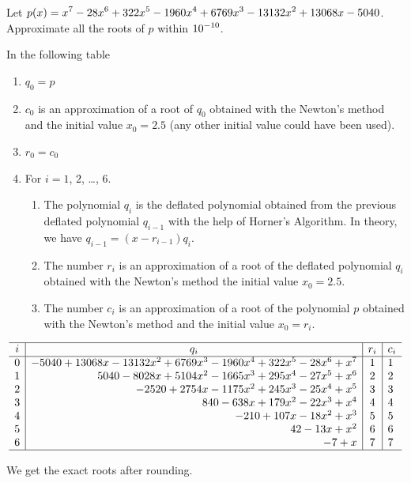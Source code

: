 \begin{egg}
Let $\displaystyle p(x) = x^7 - 28x^6 +322x^5 - 1960x^4 + 6769x^3
- 13132x^2 +13068x - 5040$.  Approximate all the roots of $p$ within
$\displaystyle 10^{-10}$.

In the following table
\begin{enumerate}
\item $q_0 = p$
\item $c_0$ is an approximation of a root of $q_0$ obtained with the
  Newton's method and the initial value $x_0 = 2.5$ (any
  other initial value could have been used).
\item $r_0 = c_0$
\item For $i=1$, $2$, \ldots, $6$.
{
\renewcommand{\labelenumii}{(\roman{enumii})}
\begin{enumerate}
\item The polynomial $q_i$ is the deflated polynomial obtained from the
  previous deflated polynomial $q_{i-1}$ with the help of Horner's
  Algorithm.  In theory, we have $q_{i-1} = (x-r_{i-1})q_i$.
\item The number $r_i$ is an approximation of a root of the deflated
  polynomial $q_i$ obtained with the Newton's method the initial value
  $x_0 = 2.5$.
\item The number $c_i$ is an approximation of a root of the polynomial
  $p$ obtained with the Newton's method and the initial value $x_0 = r_i$.
\end{enumerate}
}
\end{enumerate}

\[
\begin{array}{c|r|c|l}
\hline
i & \multicolumn{1}{c|}{q_i} & r_i & \multicolumn{1}{c}{c_i} \\
\hline
0 & -5040 + 13068x -13132x^2 + 6769x^3 -1960x^4 + 322x^5 -28x^6 + x^7
&  1 &  1 \\
1 & 5040 -8028x + 5104x^2 -1665x^3 +295x^4 -27x^5 + x^6 & 2 & 2 \\
2 & -2520 +2754x -1175x^2 + 245x^3 -25x^4 + x^5 & 3 & 3 \\
3 & 840 -638x + 179x^2 -22x^3 + x^4 & 4 & 4 \\
4 & -210 + 107x -18x^2 +x^3 & 5 & 5 \\
5 & 42 -13x + x^2 & 6 & 6 \\
6 & -7 + x & 7 & 7 \\
\hline
\end{array}
\]

We get the exact roots after rounding.
\end{egg}

